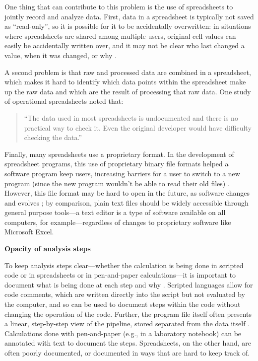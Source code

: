 \documentclass[]{tufte-book}
\begin{document}
One thing that can contribute to this problem is the use of spreadsheets to
jointly record and analyze data. First, data in a spreadsheet is typically not
saved as ``read-only'', so it is possible for it to be accidentally overwritten:
in situations where spreadsheets are shared among multiple users, original cell
values can easily be accidentally written over, and it may not be clear who last
changed a value, when it was changed, or why \citep{altarawneh2017pilot}.

A second problem is that raw and processed data are combined in a spreadsheet,
which makes it hard to identify which data points within the spreadsheet make up
the raw data and which are the result of processing that raw data. One study of
operational spreadsheets noted that:

\begin{quote}
``The data used in most spreadsheets is undocumented and there is no practical
way to check it. Even the original developer would have difficulty checking the
data.'' \citep{powell2009errors}
\end{quote}

Finally, many spreadsheets use a proprietary format. In the development of
spreadsheet programs, this use of proprietary binary file formats helped a
software program keep users, increasing barriers for a user to switch to a new
program (since the new program wouldn't be able to read their old files)
\citep{campbell2007number}. However, this file format may be hard to open in the
future, as software changes and evolves \citep{michener2015ten}; by comparison, plain
text files should be widely accessible through general purpose tools---a text
editor is a type of software available on all computers, for
example---regardless of changes to proprietary software like Microsoft Excel.

\textbf{Opacity of analysis steps}

To keep analysis steps clear---whether the calculation is being done in scripted
code or in spreadsheets or in pen-and-paper calculations---it is important to
document what is being done at each step and why \citep{goodman2014ten}. Scripted
languages allow for code comments, which are written directly into the script
but not evaluated by the computer, and so can be used to document steps within
the code without changing the operation of the code. Further, the program file
itself often presents a linear, step-by-step view of the pipeline, stored
separated from the data itself \citep{creeth1985microcomputer}. Calculations done
with pen-and-paper (e.g., in a laboratory notebook) can be annotated with text
to document the steps. Spreadsheets, on the other hand, are often poorly
documented, or documented in ways that are hard to keep track of.
\end{document}
